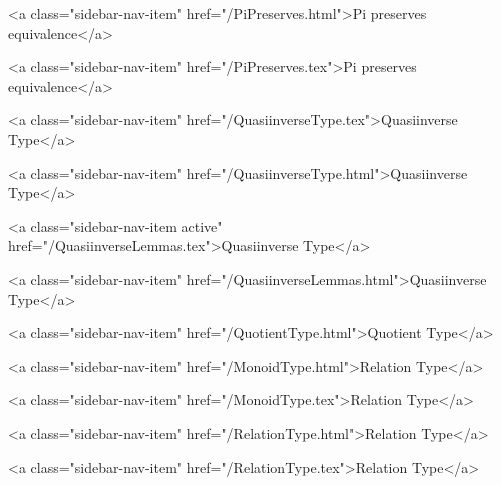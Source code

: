       
        
          <a class="sidebar-nav-item" href="/PiPreserves.html">Pi preserves equivalence</a>
        
      
    
      
        
          <a class="sidebar-nav-item" href="/PiPreserves.tex">Pi preserves equivalence</a>
        
      
    
      
        
          <a class="sidebar-nav-item" href="/QuasiinverseType.tex">Quasiinverse Type</a>
        
      
    
      
        
          <a class="sidebar-nav-item" href="/QuasiinverseType.html">Quasiinverse Type</a>
        
      
    
      
        
          <a class="sidebar-nav-item active" href="/QuasiinverseLemmas.tex">Quasiinverse Type</a>
        
      
    
      
        
          <a class="sidebar-nav-item" href="/QuasiinverseLemmas.html">Quasiinverse Type</a>
        
      
    
      
        
          <a class="sidebar-nav-item" href="/QuotientType.html">Quotient Type</a>
        
      
    
      
        
          <a class="sidebar-nav-item" href="/MonoidType.html">Relation Type</a>
        
      
    
      
        
          <a class="sidebar-nav-item" href="/MonoidType.tex">Relation Type</a>
        
      
    
      
        
          <a class="sidebar-nav-item" href="/RelationType.html">Relation Type</a>
        
      
    
      
        
          <a class="sidebar-nav-item" href="/RelationType.tex">Relation Type</a>
        
